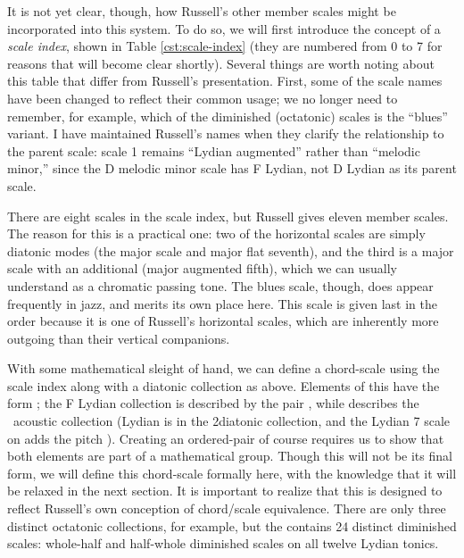 It is not yet clear, though, how Russell's other member scales might be
incorporated into this system. To do so, we will first introduce the concept
of a \emph{scale index}, shown in Table \ref{cst:scale-index} (they are
numbered from 0 to 7 for reasons that will become clear shortly). Several
things are worth noting about this table that differ from Russell's
presentation. First, some of the scale names have been changed to reflect
their common usage; we no longer need to remember, for example, which of the
diminished (octatonic) scales is the ``blues'' variant. I have
maintained Russell's names when they clarify the relationship to the parent
scale: scale 1 remains ``Lydian augmented'' rather than ``melodic minor,''
since the D melodic minor scale has F Lydian, not D Lydian as its parent scale.

There are eight scales in the scale index, but Russell gives eleven member
scales. The reason for this is a practical one: two of the horizontal scales
are simply diatonic modes (the major scale and major flat seventh), and the
third is a major scale with an additional \sharp{} (major augmented
fifth), which we can usually understand as a chromatic passing tone. The blues
scale, though, does appear frequently in jazz, and merits its own place
here. This scale is given last in the order because it is one of
Russell's horizontal scales, which are inherently more outgoing than their
vertical companions.

With some mathematical sleight of hand, we can define a chord-scale \gis using
the scale index along with a diatonic collection as above. Elements of this
\gis have the form ;
the F Lydian collection is described by the pair ,
while  describes the \Eflat\ acoustic
collection (\Eflat Lydian is in the 2\flat diatonic collection, and the Lydian
\flat{}7 scale on \Eflat adds the pitch \Dflat). Creating an ordered-pair \gis
of course requires us to show that both elements are part of a mathematical
group. Though this will not be its final form, we will define this chord-scale
\gis formally here, with the knowledge that it will be relaxed in the next
section. It is important to realize that this \gis is designed to reflect
Russell's own conception of chord/scale equivalence. There are only three
distinct octatonic collections, for example, but the \gis contains 24 distinct
diminished scales: whole-half and half-whole diminished scales on all twelve
Lydian tonics.

